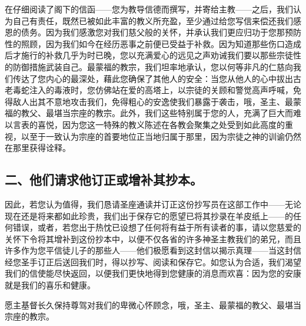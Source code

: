 在仔细阅读了阁下的信函——您为教导信德而撰写，并寄给主教——之后，我们认为自己有责任，既然已被如此丰富的教义所充盈，至少通过给您写信来偿还我们感恩的债务。因为我们感激您对我们慈父般的关怀，并承认我们更应归功于您那预防性的照顾，因为我们如今在经历恶事之前便已受益于补救。因为知道那些伤口造成后才施行的补救几乎为时已晚，您以充满爱心的远见之声劝诫我们要以那些宗徒性的防御措施武装自己。最蒙福的教宗，我们坦率地承认，您以何等非凡的仁慈向我们传达了您内心的最深处，藉此您确保了其他人的安全：当您从他人的心中拔出古老毒蛇注入的毒液时，您仿佛站在爱的高塔上，以宗徒的关顾和警觉高声呼喊，免得敌人出其不意地攻击我们，免得粗心的安逸使我们暴露于袭击，哦，圣主、最蒙福的教父、最堪当宗座的教宗。此外，我们这些特别属于您的人，充满了巨大而难以言表的喜悦，因为您这一特殊的教义陈述在各教会聚集之处受到如此高度的重视，以至于一致认为宗座的首要地位正当地归属于那里，因为宗徒之神的训谕仍然在那里获得诠释。\par


\subsection{二、他们请求他订正或增补其抄本。}

因此，若您认为值得，我们恳请圣座通读并订正这份抄写员在这部工作中——无论现在还是将来都如此珍贵，我们出于保存它的愿望已将其抄录在羊皮纸上——的任何错误，或者，若您出于热忱已设想了任何将有益于所有读者的事，请以您慈爱的关怀下令将其增补到这份抄本中，以便不仅各省的许多神圣主教我们的弟兄，而且许多作为您平信徒儿子的那些人——他们极愿看到这封信以揭示真理——当这封信经您圣手订正后送回我们时，得以抄写、阅读和保存它。如您认为合适，我们渴望我们的信使能尽快返回，以便我们更快地得到您健康的消息而欢喜：因为您的安康就是我们的喜乐和健康。\par

愿主基督长久保持尊驾对我们的卑微心怀顾念，哦，圣主、最蒙福的教父、最堪当宗座的教宗。\par

\par

\par

\par

